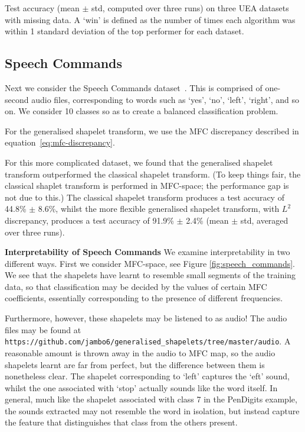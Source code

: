 \documentclass{article}
\theoremstyle{plain}
\theoremstyle{definition}
\newcommand{\boldheading}[1]{

\textbf{#1}\quad}
\begin{document}
\begin{table}[ht]
    \centering
    
	\caption{Test accuracy (mean $\pm$ std, computed over three runs) on three UEA datasets with missing data. A `win' is defined as the number of times each algorithm was within 1 standard deviation of the top performer for each dataset.}\label{tab:missing_and_length}
\end{table}


\subsection{Speech Commands}
Next we consider the Speech Commands dataset~\cite{warden2018speech}. This is comprised of one-second audio files, corresponding to words such as `yes', `no', `left', `right', and so on. We consider 10 classes so as to create a balanced classification problem.

For the generalised shapelet transform, we use the MFC discrepancy described in equation~\eqref{eq:mfc-discrepancy}.%

For this more complicated dataset, we found that the generalised shapelet transform outperformed the classical shapelet transform. (To keep things fair, the classical shaplet transform is performed in MFC-space; the performance gap is not due to this.) The classical shapelet transform produces a test accuracy of 44.8\% $\pm$ 8.6\%, whilst the more flexible generalised shapelet transform, with $L^2$ discrepancy, produces a test accuracy of 91.9\% $\pm$ 2.4\% (mean $\pm$ std, averaged over three runs).

\boldheading{Interpretability of Speech Commands}
We examine interpretability in two different ways. First we consider MFC-space, see Figure \ref{fig:speech_commands}. We see that the shapelets have learnt to resemble small segments of the training data, so that classification may be decided by the values of certain MFC coefficients, essentially corresponding to the presence of different frequencies.

Furthermore, however, these shapelets may be listened to as audio! The audio files may be found at \texttt{https://github.com/jambo6/generalised\_shapelets/tree/master/audio}. A reasonable amount is thrown away in the audio to MFC map, so the audio shapelets learnt are far from perfect, but the difference between them is nonetheless clear. The shapelet corresponding to  `left' captures the `eft' sound, whilst the one associated with `stop' actually sounds like the word itself. In general, much like the shapelet associated with class 7 in the PenDigits example, the sounds extracted may not resemble the word in isolation, but instead capture the feature that distinguishes that class from the others present.
\end{document}
